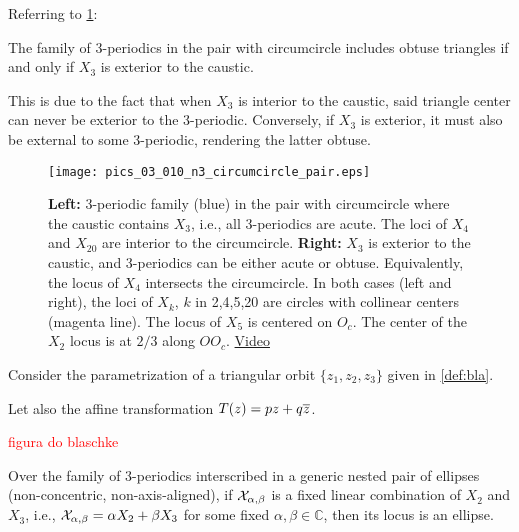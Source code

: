 Referring to  \cref{fig:nonconcentric-circumcircle-circular-loci-right-tris}:

\begin{observation}
The family of 3-periodics in the pair with circumcircle includes obtuse triangles if and only if $X_3$ is exterior to the caustic. \end{observation}

This is due to the fact that when $X_3$ is interior to the caustic, said triangle center can never be exterior to the 3-periodic. Conversely, if $X_3$ is exterior, it must also be external to some 3-periodic, rendering the latter obtuse.

\begin{figure}
    \centering
    \texttt{[image: pics\_03\_010\_n3\_circumcircle\_pair.eps]}
    \caption{\textbf{Left:} 3-periodic family (blue) in the pair with circumcircle where the caustic contains $X_3$, i.e., all 3-periodics are acute. The loci of $X_4$ and $X_{20}$ are interior to the circumcircle. \textbf{Right:} $X_3$ is exterior to the caustic, and 3-periodics can be either acute or obtuse. Equivalently, the locus of $X_4$ intersects the circumcircle. In both cases (left and right), the loci of $X_k$, $k$ in 2,4,5,20 are circles with collinear centers (magenta line). The locus of $X_5$ is centered on $O_c$. The center of the $X_2$ locus is at $2/3$ along $O O_c$. \href{https://youtu.be/HXgJQo2UT_8}{Video}}
    \label{fig:nonconcentric-circumcircle-circular-loci-right-tris}
\end{figure} 


Consider the parametrization of a triangular orbit $\{z_1,z_2,z_3\}$ given in \cref{def:bla}.

Let also the  affine transformation
$T(z)=pz+q\overline z$.

\textcolor{red}{figura do blaschke}

\begin{theorem}
Over the family of 3-periodics interscribed in a generic nested pair of ellipses (non-concentric, non-axis-aligned),
if $\mathcal{X}_{\alpha,\beta}$ is a fixed linear combination of $X_2$ and $X_3$, i.e., $\mathcal{X}_{\alpha,\beta}=\alpha X_2+\beta X_3$ for some fixed $\alpha,\beta\in\mathbb{C}$, then its locus is an ellipse. 
\label{thm:ellipse-locus-linear-combination}
\end{theorem}


